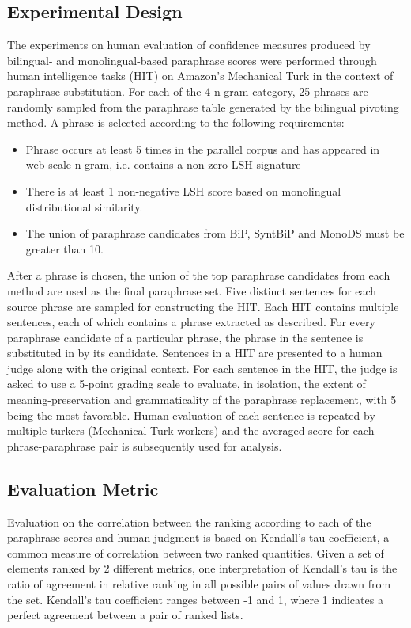 \documentclass[11pt]{article}
\begin{document}
\subsection{Experimental Design}
The experiments on human evaluation of confidence measures produced by bilingual- and monolingual-based paraphrase scores were performed through human intelligence tasks (HIT) on Amazon's Mechanical Turk in the context of paraphrase substitution. For each of the 4 n-gram category, 25 phrases are randomly sampled from the paraphrase table generated by the bilingual pivoting method. A phrase is selected according to the following requirements:

\begin{itemize}
\item Phrase occurs at least 5 times in the parallel corpus and has appeared in web-scale n-gram, i.e. contains a non-zero LSH signature
\item There is at least 1 non-negative LSH score based on monolingual distributional similarity.
\item The union of paraphrase candidates from BiP, SyntBiP and MonoDS must be greater than 10.
\end{itemize}

After a phrase is chosen, the union of the top paraphrase candidates from each method are used as the final paraphrase set. Five distinct sentences for each source phrase are sampled for constructing the HIT. Each HIT contains multiple sentences, each of which contains a phrase extracted as described. For every paraphrase candidate of a particular phrase, the phrase in the sentence is substituted in by its candidate. Sentences in a HIT are presented to a human judge along with the original context. For each sentence in the HIT, the judge is asked to use a 5-point grading scale to evaluate, in isolation, the extent of meaning-preservation and grammaticality of the paraphrase replacement, with 5 being the most favorable. Human evaluation of each sentence is repeated by multiple turkers (Mechanical Turk workers) and the averaged score for each phrase-paraphrase pair is subsequently used for analysis.


\subsection{Evaluation Metric}
Evaluation on the correlation between the ranking according to each of the paraphrase scores and human judgment is based on Kendall's tau coefficient, a common measure of correlation between two ranked quantities. Given a set of elements ranked by 2 different metrics, one interpretation of Kendall's tau is the ratio of agreement in relative ranking in all possible pairs of values drawn from the set. Kendall's tau coefficient ranges between -1 and 1, where 1 indicates a perfect agreement between a pair of ranked lists. 
\end{document}
